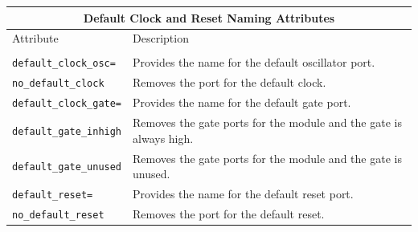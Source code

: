 \documentclass[twoside,letterpaper]{article}
\newcommand{\te}[1]{\texttt{#1}}
\begin{document}



\begin{center}
\begin{tabular}{|p{2.0 in}|p{3.6 in}|}
\hline
\multicolumn{2}{|c|}{Default Clock and Reset Naming Attributes}\\
\hline
Attribute&Description\\
&\\
\hline
\hline
\te{default\_clock\_osc=} & Provides the  name
for  the default oscillator port. \\
\hline
\te{no\_default\_clock}& Removes the port for the default clock. \\
\hline
\te{default\_clock\_gate=}  &Provides the  name
for the default gate port.\\
\hline
 \te{default\_gate\_inhigh}  & Removes the gate ports for the module
 and the gate is always high. \\
 \hline
 \te{default\_gate\_unused}  & Removes the gate ports for the module
 and the gate is unused. \\
\hline
\te{default\_reset=}& Provides the   name
for the default reset port. \\
\hline
\te{no\_default\_reset}&Removes the port for the default reset.\\
\hline
\end{tabular}
\end{center}
\end{document}
